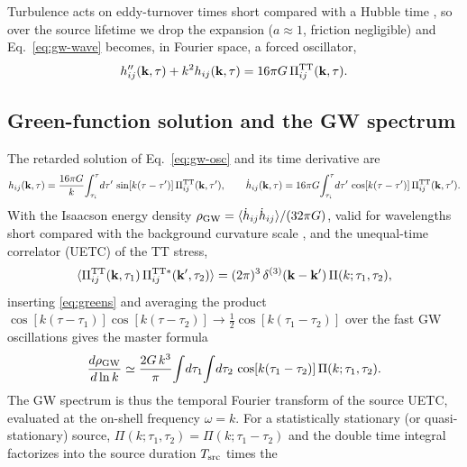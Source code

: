 \documentclass[10pt,prd,aps,nobibnotes,superscriptaddress,preprintnumbers,notitlepage]{revtex4-1}
\newcommand{\kb}{{\bf k}}
\begin{document}
Turbulence acts on eddy-turnover times short compared with a Hubble time
\cite{Kosowsky:2001xp,Caprini:2006jb}, so over the source lifetime we drop the
expansion ($a\approx 1$, friction negligible) and Eq.~\eqref{eq:gw-wave} becomes, in Fourier space, a forced
oscillator,
\begin{equation}
  h_{ij}''(\kb,\tau) + k^2 h_{ij}(\kb,\tau) = 16\pi G\,\Pi_{ij}^{\rm TT}(\kb,\tau).
  \label{eq:gw-osc}
\end{equation}

\subsection{Green-function solution and the GW spectrum}
\label{sec:framework-green}

The retarded solution of Eq.~\eqref{eq:gw-osc} and its time derivative are
\begin{equation}
  h_{ij}(\kb,\tau) = \frac{16\pi G}{k}\!\int_{\tau_i}^{\tau}\!d\tau'\,
  \sin[k(\tau-\tau')]\,\Pi_{ij}^{\rm TT}(\kb,\tau'),
  \qquad
  \dot h_{ij}(\kb,\tau) = 16\pi G\!\int_{\tau_i}^{\tau}\!d\tau'\,
  \cos[k(\tau-\tau')]\,\Pi_{ij}^{\rm TT}(\kb,\tau').
  \label{eq:greens}
\end{equation}
With the Isaacson energy density $\rho_{\rm GW}=\langle\dot h_{ij}\dot h_{ij}\rangle/(32\pi G)$,
valid for wavelengths short compared with the background curvature scale
\cite{Maggiore:2007}, and the unequal-time correlator (UETC) of the TT stress,
\begin{equation}
  \langle\Pi_{ij}^{\rm TT}(\kb,\tau_1)\,\Pi_{ij}^{\rm TT*}(\kb',\tau_2)\rangle
  = (2\pi)^3\,\delta^{(3)}(\kb-\kb')\,\Pi(k;\tau_1,\tau_2),
  \label{eq:uetc}
\end{equation}
inserting \eqref{eq:greens} and averaging the product
$\cos[k(\tau-\tau_1)]\cos[k(\tau-\tau_2)]\to\tfrac12\cos[k(\tau_1-\tau_2)]$ over
the fast GW oscillations gives the master formula
\cite{Kosowsky:2001xp,Caprini:2006jb,Gogoberidze:2007an}
\begin{equation}
  \frac{d\rho_{\rm GW}}{d\ln k}
  \simeq \frac{2G\,k^3}{\pi}\!\int\! d\tau_1\!\int\! d\tau_2\,
  \cos[k(\tau_1-\tau_2)]\,\Pi(k;\tau_1,\tau_2).
  \label{eq:master}
\end{equation}
The GW spectrum is thus the temporal Fourier transform of the source UETC,
evaluated at the on-shell frequency $\omega=k$. For a statistically stationary
(or quasi-stationary) source, $\Pi(k;\tau_1,\tau_2)=\Pi(k;\tau_1-\tau_2)$ and the
double time integral factorizes into the source duration $T_{\rm src}$ times the
\end{document}
